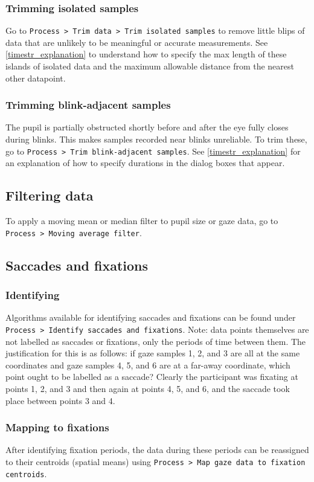 \documentclass{article}
\begin{document}
\subsubsection{Trimming isolated samples}
Go to \texttt{Process > Trim data > Trim isolated samples} to remove little blips of data that are unlikely to be meaningful or accurate measurements. See \ref{timestr_explanation} to understand how to specify the max length of these islands of isolated data and the maximum allowable distance from the nearest other datapoint.
\subsubsection{Trimming blink-adjacent samples}
The pupil is partially obstructed shortly before and after the eye fully closes during blinks. This makes samples recorded near blinks unreliable. To trim these, go to \texttt{Process > Trim blink-adjacent samples}. See \ref{timestr_explanation} for an explanation of how to specify durations in the dialog boxes that appear.
\subsection{Filtering data}
To apply a moving mean or median filter to pupil size or gaze data, go to \texttt{Process > Moving average filter}.
\subsection{Saccades and fixations}
\subsubsection{Identifying}
Algorithms available for identifying saccades and fixations can be found under \texttt{Process > Identify saccades and fixations}. Note: data points themselves are not labelled as saccades or fixations, only the periods of time between them. The justification for this is as follows: if gaze samples 1, 2, and 3 are all at the same coordinates and gaze samples 4, 5, and 6 are at a far-away coordinate, which point ought to be labelled as a saccade? Clearly the participant was fixating at points 1, 2, and 3 and then again at points 4, 5, and 6, and the saccade took place between points 3 and 4.
\subsubsection{Mapping to fixations}
After identifying fixation periods, the data during these periods can be reassigned to their centroids (spatial means) using \texttt{Process > Map gaze data to fixation centroids}.
\end{document}

